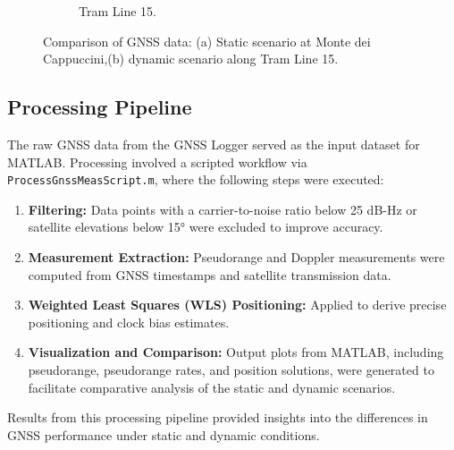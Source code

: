 \begin{figure}[h!]
\begin{subfigure}{0.23\textwidth}
          \caption{Tram Line 15.}
          \label{fig:dynamic_scenario}
      \end{subfigure}
      \vspace{0.35cm}
      \caption{Comparison of GNSS data: (a) Static scenario at Monte dei Cappuccini,(b) dynamic scenario along Tram Line 15.}
      \label{fig:gnss_comparison}
  \end{figure}

    \subsection{Processing Pipeline}
    The raw GNSS data from the GNSS Logger served as the input dataset for MATLAB. Processing involved a scripted workflow via \texttt{ProcessGnssMeasScript.m}, where the following steps were executed:
    \begin{enumerate}
        \item \textbf{Filtering:} Data points with a carrier-to-noise ratio below 25 dB-Hz or satellite elevations below 15° were excluded to improve accuracy.
        \item \textbf{Measurement Extraction:} Pseudorange and Doppler measurements were computed from GNSS timestamps and satellite transmission data.
        \item \textbf{Weighted Least Squares (WLS) Positioning:} Applied to derive precise positioning and clock bias estimates.
        \item \textbf{Visualization and Comparison:} Output plots from MATLAB, including pseudorange, pseudorange rates, and position solutions, were generated to facilitate comparative analysis of the static and dynamic scenarios.
    \end{enumerate}
    
    Results from this processing pipeline provided insights into the differences in GNSS performance under static and dynamic conditions.
    